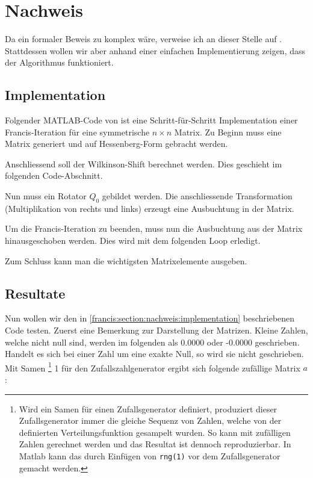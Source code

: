 \section{Nachweis\label{francis:section:nachweis}}

Da ein formaler Beweis zu komplex wäre, verweise ich an dieser Stelle auf \cite{francis:watkins_book}.
Stattdessen wollen wir aber anhand einer einfachen Implementierung zeigen, dass der Algorithmus funktioniert.

\subsection{Implementation\label{francis:section:nachweis:implementation}}
Folgender MATLAB-Code von \cite{francis:watkins_book} ist eine Schritt-für-Schritt Implementation einer Francis-Iteration für eine symmetrische $n \times n$ Matrix.
Zu Beginn muss eine Matrix generiert und auf Hessenberg-Form gebracht werden.

Anschliessend soll der Wilkinson-Shift berechnet werden.
Dies geschieht im folgenden Code-Abschnitt.

Nun muss ein Rotator $Q_0$ gebildet werden.
Die anschliessende Transformation (Multiplikation von rechts und links) erzeugt eine Ausbuchtung in der Matrix.

Um die Francis-Iteration zu beenden, muss nun die Ausbuchtung aus der Matrix hinausgeschoben werden.
Dies wird mit dem folgenden Loop erledigt.

Zum Schluss kann man die wichtigsten Matrixelemente ausgeben.


\subsection{Resultate\label{francis:section:nachweis:resultate}}
Nun wollen wir den in \ref{francis:section:nachweis:implementation} beschriebenen Code testen.
Zuerst eine Bemerkung zur Darstellung der Matrizen. 
Kleine Zahlen, welche nicht null sind, werden im folgenden als 0.0000 oder -0.0000 geschrieben.
Handelt es sich bei einer Zahl um eine exakte Null, so wird sie nicht geschrieben.
Mit Samen \footnote{Wird ein Samen für einen Zufallsgenerator definiert, produziert dieser Zufallsgenerator immer die gleiche Sequenz von Zahlen, welche von der definierten Verteilungsfunktion gesampelt wurden.
%
%
So kann mit zufälligen Zahlen gerechnet werden und das Resultat ist dennoch reproduzierbar.
In Matlab kann das durch Einfügen von \texttt{rng(1)} vor dem Zufallsgenerator gemacht werden.}
1 für den Zufallszahlgenerator ergibt sich folgende zufällige Matrix $a$:

